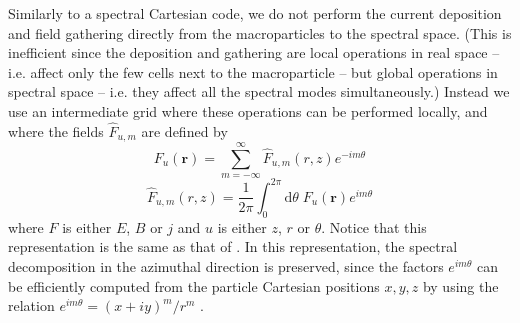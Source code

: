 \documentclass[a4paper]{article}   	%
\newcommand{\TInteg}[1]{\int_{0}^{2\pi} \!\!\!\!\!\!\!\! \mathrm{d}#1}
\renewcommand{\vec}[1]{\boldsymbol{#1}}
\begin{document}
Similarly to a spectral Cartesian code, we do not perform the
current deposition and field gathering directly from the
macroparticles to the spectral space. (This is inefficient since the
deposition and gathering are local operations in real space -- i.e. affect
only the few cells next to the macroparticle -- but global operations
in spectral space -- i.e. they affect all the spectral modes
simultaneously.) Instead we use an intermediate grid where these
operations can be performed locally, and where the fields $\hat{F}_{u,m}$
are defined by
\begin{equation} 
\label{eq:IntermBwTrans}
F_u(\vec{r}) = \sum_{m=-\infty}^{\infty} \hat{F}_{u,m}(r,z)
e^{-im\theta} 
\end{equation}
\begin{equation}
\label{eq:IntermFwTrans}
\hat{F}_{u,m}(r,z) = \frac{1}{2\pi} \TInteg{\theta} \;
F_u(\vec{r})e^{im\theta}
\end{equation}
where ${F}$ is either ${E}$, ${B}$ or
${j}$ and $u$ is either $z$, $r$ or $\theta$. Notice that this representation is the
same as that of \citep{Lifschitz, Davidson}. In this
representation, the spectral decomposition in the azimuthal
direction is preserved, since the factors $e^{im\theta}$ can be efficiently computed from the
particle Cartesian positions $x,y,z$ by using the relation $e^{im\theta} = (x+iy)^m/r^m$
\citep{Lifschitz}.
\end{document}
